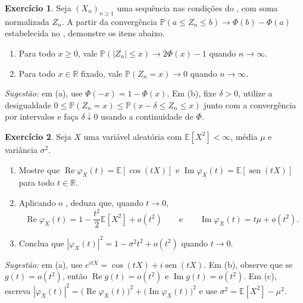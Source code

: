 \documentclass[12pt,portuguese]{article}
\theoremstyle{definition}
\theoremstyle{plainexercise}
\newtheorem{exercise}{Exercício}
\theoremstyle{starredexercise}
\theoremstyle{definition}
\renewcommand{\sin}{\operatorname{sen}}
\begin{document}
\begin{exercise}\label{exercise:tlc-imediato-intervalos}
Seja $(X_n)_{n\geqslant1}$ uma sequência nas condições do ,
com soma normalizada $Z_n$. A partir da convergência
$\mathbb{P}(a\leqslant Z_n\leqslant b)\to\Phi(b)-\Phi(a)$ estabelecida no
, demonstre os itens abaixo.
\begin{enumerate}[label=(\alph*)]
\item Para todo $x\geqslant0$, vale
$\mathbb{P}(|Z_n|\leqslant x)\to 2\Phi(x)-1$ quando $n\to\infty$.
\item Para todo $x\in\mathbb{R}$ fixado, vale $\mathbb{P}(Z_n=x)\to0$ quando
$n\to\infty$.
\end{enumerate}

\noindent\emph{Sugestão:} em (a), use $\Phi(-x)=1-\Phi(x)$. Em (b), fixe $\delta>0$,
utilize a desigualdade
$0\leqslant\mathbb{P}(Z_n=x)\leqslant\mathbb{P}(x-\delta\leqslant Z_n\leqslant x)$
junto com a convergência por intervalos e faça $\delta\downarrow0$ usando a
continuidade de $\Phi$.
\end{exercise}

\begin{exercise}\label{exercise:tlc-imediato-modulo-quadrado}
Seja $X$ uma variável aleatória com $\mathbb{E}[X^2]<\infty$, média $\mu$ e
variância $\sigma^2$.
\begin{enumerate}[label=(\alph*)]
\item Mostre que $\operatorname{Re}\varphi_X(t)=\mathbb{E}[\cos(tX)]$ e
$\operatorname{Im}\varphi_X(t)=\mathbb{E}[\sin(tX)]$ para todo
$t\in\mathbb{R}$.
\item Aplicando o , deduza que, quando $t\to0$,
\[
  \operatorname{Re}\varphi_X(t)
  =1-\frac{t^2}{2}\mathbb{E}[X^2]+o(t^2)
  \qquad\text{e}\qquad
  \operatorname{Im}\varphi_X(t)
  =t\mu+o(t^2).
\]
\item Conclua que $|\varphi_X(t)|^2=1-\sigma^2t^2+o(t^2)$ quando $t\to0$.
\end{enumerate}

\noindent\emph{Sugestão:} em (a), use $e^{itX}=\cos(tX)+i\sin(tX)$. Em (b), observe que
se $g(t)=o(t^2)$, então $\operatorname{Re}g(t)=o(t^2)$ e
$\operatorname{Im}g(t)=o(t^2)$. Em (c), escreva
$|\varphi_X(t)|^2=\bigl(\operatorname{Re}\varphi_X(t)\bigr)^2+\bigl(\operatorname{Im}\varphi_X(t)\bigr)^2$
e use $\sigma^2=\mathbb{E}[X^2]-\mu^2$.
\end{exercise}
\end{document}

